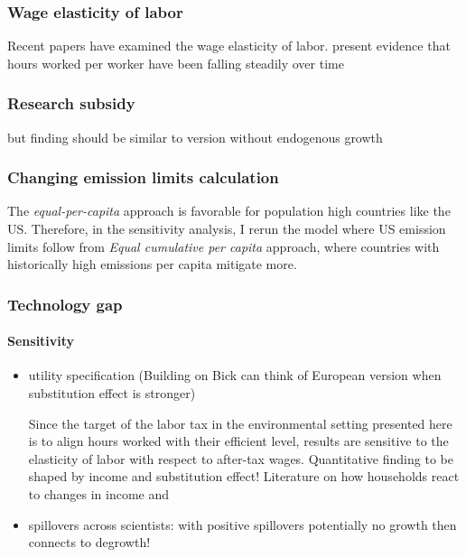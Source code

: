 \subsubsection{Wage elasticity of labor}

Recent papers have examined the wage elasticity of labor. \cite{Boppart2019LaborPerspectiveb} present evidence that hours worked per worker have been falling steadily over time 

\subsubsection{Research subsidy}
but finding should be similar to version without endogenous growth
\subsubsection{Changing emission limits calculation}
The \textit{equal-per-capita} approach is favorable for population high countries like the US. Therefore, in the sensitivity analysis, I rerun the model where US emission limits follow from \textit{Equal cumulative per capita} approach, where countries with historically  high emissions per capita mitigate more.

\subsubsection{Technology gap}

\paragraph{Sensitivity}
\begin{itemize}
	\item utility specification (Building on Bick can think of European version when substitution effect is stronger)
	
	Since the target of the labor tax in the environmental setting presented here is to align hours worked with their efficient level, results are sensitive to the elasticity of labor with respect to after-tax wages. 
	Quantitative finding to be shaped by income and substitution effect!
	Literature on how households react to changes in income \cite{Bick2018HowImplications} and \cite{Boppart2019LaborPerspectiveb}
	
	\item spillovers across scientists: with positive spillovers potentially no growth \ar then connects to degrowth!
\end{itemize}